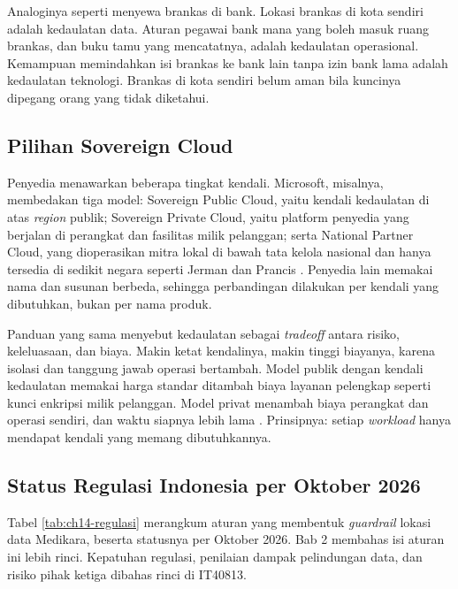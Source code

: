 Analoginya seperti menyewa brankas di bank. Lokasi brankas di kota sendiri adalah kedaulatan data.
Aturan pegawai bank mana yang boleh masuk ruang brankas, dan buku tamu yang mencatatnya, adalah
kedaulatan operasional. Kemampuan memindahkan isi brankas ke bank lain tanpa izin bank lama adalah
kedaulatan teknologi. Brankas di kota sendiri belum aman bila kuncinya dipegang orang yang tidak
diketahui.

\subsection{Pilihan Sovereign Cloud}

Penyedia menawarkan beberapa tingkat kendali. Microsoft, misalnya, membedakan tiga model: Sovereign
Public Cloud, yaitu kendali kedaulatan di atas \textit{region} publik; Sovereign Private Cloud,
yaitu platform penyedia yang berjalan di perangkat dan fasilitas milik pelanggan; serta National
Partner Cloud, yang dioperasikan mitra lokal di bawah tata kelola nasional dan hanya tersedia di
sedikit negara seperti Jerman dan Prancis \cite{c14-azure-sovereignty}. Penyedia lain memakai nama
dan susunan berbeda, sehingga perbandingan dilakukan per kendali yang dibutuhkan, bukan per nama
produk.

Panduan yang sama menyebut kedaulatan sebagai \textit{tradeoff} antara risiko, keleluasaan, dan
biaya. Makin ketat kendalinya, makin tinggi biayanya, karena isolasi dan tanggung jawab operasi
bertambah. Model publik dengan kendali kedaulatan memakai harga standar ditambah biaya layanan
pelengkap seperti kunci enkripsi milik pelanggan. Model privat menambah biaya perangkat dan
operasi sendiri, dan waktu siapnya lebih lama \cite{c14-azure-sovereignty}. Prinsipnya: setiap
\textit{workload} hanya mendapat kendali yang memang dibutuhkannya.

\subsection{Status Regulasi Indonesia per Oktober 2026}

Tabel \ref{tab:ch14-regulasi} merangkum aturan yang membentuk \textit{guardrail} lokasi data
Medikara, beserta statusnya per Oktober 2026. Bab 2 membahas isi aturan ini lebih rinci. Kepatuhan
regulasi, penilaian dampak pelindungan data, dan risiko pihak ketiga dibahas rinci di IT40813.

